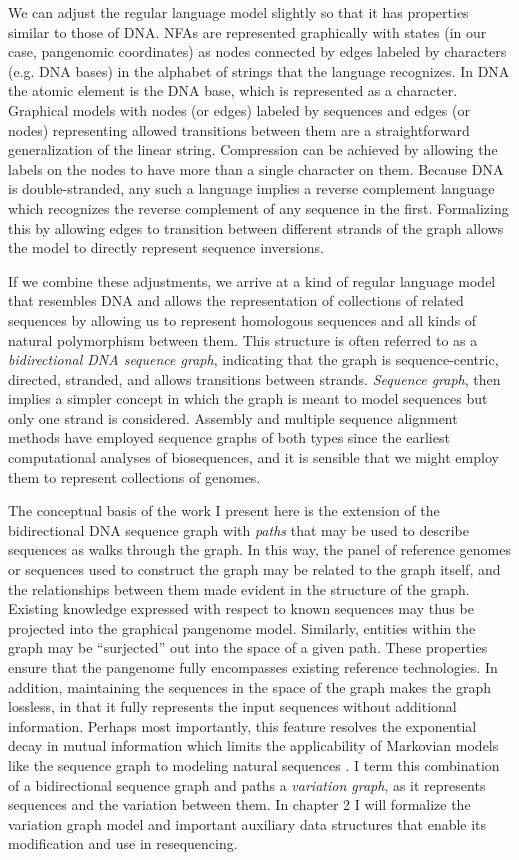We can adjust the regular language model slightly so that it has properties similar to those of DNA.
NFAs are represented graphically with states (in our case, pangenomic coordinates) as nodes connected by edges labeled by characters (e.g. DNA bases) in the alphabet of strings that the language recognizes.
In DNA the atomic element is the DNA base, which is represented as a character.
Graphical models with nodes (or edges) labeled by sequences and edges (or nodes) representing allowed transitions between them are a straightforward generalization of the linear string.
Compression can be achieved by allowing the labels on the nodes to have more than a single character on them.
Because DNA is double-stranded, any such a language implies a reverse complement language which recognizes the reverse complement of any sequence in the first.
Formalizing this by allowing edges to transition between different strands of the graph allows the model to directly represent sequence inversions.

If we combine these adjustments, we arrive at a kind of regular language model that resembles DNA and allows the representation of collections of related sequences by allowing us to represent homologous sequences and all kinds of natural polymorphism between them.
This structure is often referred to as a \emph{bidirectional DNA sequence graph}, indicating that the graph is sequence-centric, directed, stranded, and allows transitions between strands.
\emph{Sequence graph}, then implies a simpler concept in which the graph is meant to model sequences but only one strand is considered.
Assembly and multiple sequence alignment methods have employed sequence graphs of both types since the earliest computational analyses of biosequences, and it is sensible that we might employ them to represent collections of genomes.

The conceptual basis of the work I present here is the extension of the bidirectional DNA sequence graph with \emph{paths} that may be used to describe sequences as walks through the graph.
In this way, the panel of reference genomes or sequences used to construct the graph may be related to the graph itself, and the relationships between them made evident in the structure of the graph.
Existing knowledge expressed with respect to known sequences may thus be projected into the graphical pangenome model.
Similarly, entities within the graph may be ``surjected'' out into the space of a given path.
These properties ensure that the pangenome fully encompasses existing reference technologies.
In addition, maintaining the sequences in the space of the graph makes the graph lossless, in that it fully represents the input sequences without additional information.
Perhaps most importantly, this feature resolves the exponential decay in mutual information which limits the applicability of Markovian models like the sequence graph to modeling natural sequences \cite{lin2017critical}.
I term this combination of a bidirectional sequence graph and paths a \emph{variation graph}, as it represents sequences and the variation between them.
In chapter 2 I will formalize the variation graph model and important auxiliary data structures that enable its modification and use in resequencing.

